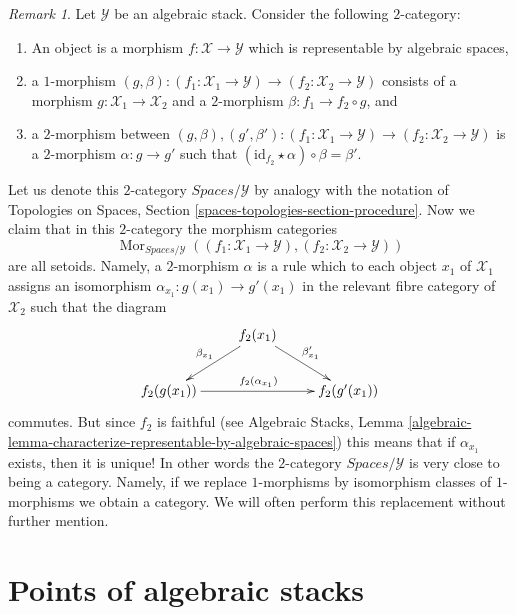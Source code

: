 \documentclass{stacks-project}
\theoremstyle{plain}
\theoremstyle{definition}
\theoremstyle{remark}
\newtheorem{remark}[subsection]{Remark}
\numberwithin{equation}{subsection}
\def\Mor{\mathop{\mathrm{Mor}}\nolimits}
\begin{document}
\begin{remark}
\label{remark-representable-over}
Let $\mathcal{Y}$ be an algebraic stack. Consider the following
$2$-category:
\begin{enumerate}
\item An object is a morphism $f : \mathcal{X} \to \mathcal{Y}$
which is representable by algebraic spaces,
\item a $1$-morphism
$(g, \beta) :
(f_1 : \mathcal{X}_1 \to \mathcal{Y})
\to
(f_2 : \mathcal{X}_2 \to \mathcal{Y})$
consists of a morphism $g : \mathcal{X}_1 \to \mathcal{X}_2$ and a
$2$-morphism $\beta : f_1 \to f_2 \circ g$, and
\item a $2$-morphism between
$(g, \beta), (g', \beta') :
(f_1 : \mathcal{X}_1 \to \mathcal{Y})
\to
(f_2 : \mathcal{X}_2 \to \mathcal{Y})$
is a $2$-morphism $\alpha : g \to g'$ such that
$(\text{id}_{f_2} \star \alpha) \circ \beta = \beta'$.
\end{enumerate}
Let us denote this $2$-category $\textit{Spaces}/\mathcal{Y}$ by
analogy with the notation of
Topologies on Spaces, Section \ref{spaces-topologies-section-procedure}.
Now we claim that in this $2$-category the morphism categories
$$
\Mor_{\textit{Spaces}/\mathcal{Y}}(
(f_1 : \mathcal{X}_1 \to \mathcal{Y}),
(f_2 : \mathcal{X}_2 \to \mathcal{Y}))
$$
are all setoids. Namely, a $2$-morphism $\alpha$ is a rule which to each
object $x_1$ of $\mathcal{X}_1$ assigns an isomorphism
$\alpha_{x_1} : g(x_1) \longrightarrow g'(x_1)$
in the relevant fibre category of $\mathcal{X}_2$ such that the diagram
$$
\xymatrix{
& f_2(x_1) \ar[ld]_{\beta_{x_1}} \ar[rd]^{\beta'_{x_1}} \\
f_2(g(x_1)) \ar[rr]^{f_2(\alpha_{x_1})} & &
f_2(g'(x_1))
}
$$
commutes. But since $f_2$ is faithful (see
Algebraic Stacks,
Lemma \ref{algebraic-lemma-characterize-representable-by-algebraic-spaces})
this means that if $\alpha_{x_1}$ exists, then it is unique! In other words the
$2$-category $\textit{Spaces}/\mathcal{Y}$ is very close to
being a category. Namely, if we replace $1$-morphisms by isomorphism
classes of $1$-morphisms we obtain a category. We will often
perform this replacement without further mention.
\end{remark}




\section{Points of algebraic stacks}
\label{section-points}
\end{document}
